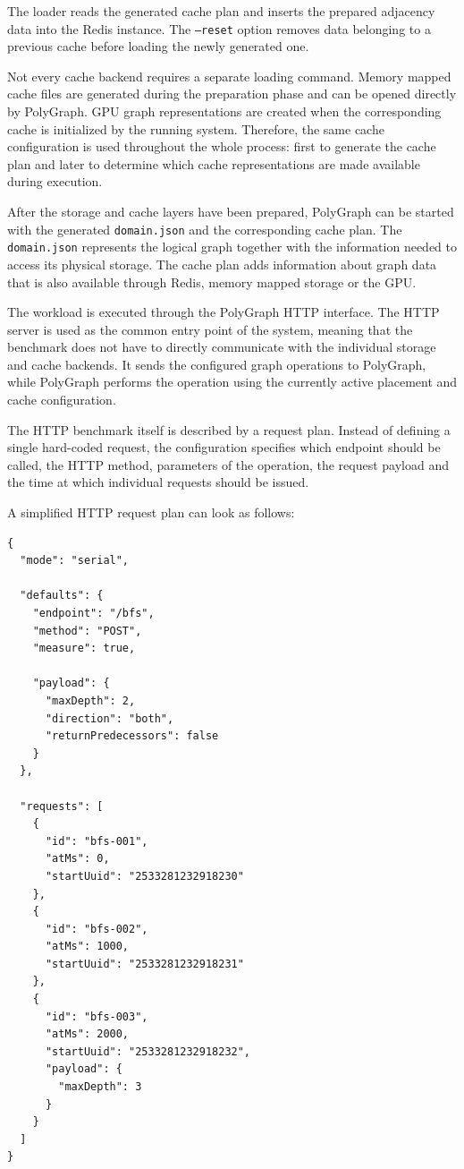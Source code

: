 \documentclass[11pt,a4paper]{article}
\begin{document}
\begin{itemize}
    The loader reads the generated cache plan and inserts the prepared
    adjacency data into the Redis instance. The \texttt{--reset} option removes
    data belonging to a previous cache before loading the newly generated one.

    Not every cache backend requires a separate loading command. Memory mapped
    cache files are generated during the preparation phase and can be opened
    directly by PolyGraph. GPU graph representations are created when the
    corresponding cache is initialized by the running system. Therefore, the
    same cache configuration is used throughout the whole process: first to
    generate the cache plan and later to determine which cache representations
    are made available during execution.
\end{itemize}

After the storage and cache layers have been prepared, PolyGraph can be started
with the generated \texttt{domain.json} and the corresponding cache plan. The
\texttt{domain.json} represents the logical graph together with the information
needed to access its physical storage. The cache plan adds information about
graph data that is also available through Redis, memory mapped storage or the
GPU.

The workload is executed through the PolyGraph HTTP interface. The HTTP server
is used as the common entry point of the system, meaning that the benchmark
does not have to directly communicate with the individual storage and cache
backends. It sends the configured graph operations to PolyGraph, while
PolyGraph performs the operation using the currently active placement and cache
configuration.

The HTTP benchmark itself is described by a request plan. Instead of defining a
single hard-coded request, the configuration specifies which endpoint should be
called, the HTTP method, parameters of the operation, the request payload and
the time at which individual requests should be issued.

A simplified HTTP request plan can look as follows:

\begin{lstlisting}[style=json]
{
  "mode": "serial",

  "defaults": {
    "endpoint": "/bfs",
    "method": "POST",
    "measure": true,

    "payload": {
      "maxDepth": 2,
      "direction": "both",
      "returnPredecessors": false
    }
  },

  "requests": [
    {
      "id": "bfs-001",
      "atMs": 0,
      "startUuid": "2533281232918230"
    },
    {
      "id": "bfs-002",
      "atMs": 1000,
      "startUuid": "2533281232918231"
    },
    {
      "id": "bfs-003",
      "atMs": 2000,
      "startUuid": "2533281232918232",
      "payload": {
        "maxDepth": 3
      }
    }
  ]
}
\end{lstlisting}
\end{document}
